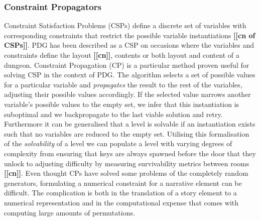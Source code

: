 \documentclass{UoYCSproject}
\begin{document}
\subsubsection{Constraint Propagators}
Constraint Satisfaction Problems (CSPs) define a discrete set of variables with corresponding constraints that restrict the possible variable instantiations \textbf{[[cn  of CSPs]]}. PDG has been described as a CSP on occasions where the variables and constraints define the layout \textbf{[[cn]]}, contents \parencite{HorswillCSPMission} or both layout and content \parencite{GreenCSPboth} of a dungeon. Constraint Propagation (CP) is a particular method proven useful for solving CSP in the context of PDG. The algorithm selects a set of possible values for a particular variable and \textit{propagates} the result to the rest of the variables, adjusting their possible values accordingly. If the selected value narrows another variable's possible values to the empty set, we infer that this instantiation is suboptimal and we backpropagate to the last viable solution and retry. Furthermore it can be generalised that a level is solvable if an instantiation exists such that no variables are reduced to the empty set. Utilising this formalisation of the \textit{solvability} of a level we can populate a level with varying degrees of complexity from ensuring that keys are always spawned before the door that they unlock to adjusting difficulty by measuring survivability metrics between rooms \textbf{[[cn]]}. Even thought CPs have solved some problems of the completely random generators, formulating a numerical constraint for a narrative element can be difficult. The complication is both in the translation of a story element to a numerical representation and in the computational expense that comes with computing large amounts of permutations.
\end{document}
